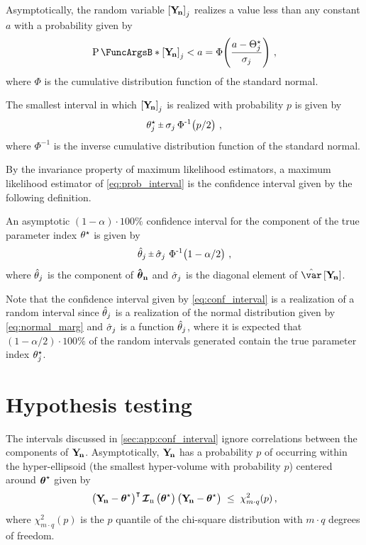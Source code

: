 \documentclass[
    11pt,
    extrafontsizes,
    article,
    oldfontcommands,
    final,
    oneside,
    openany,
    hidelinks]{memoir}
\begin{document}
Asymptotically, the random variable $\left[\mathrm{\boldsymbol{\mathbf{Y_{\!n}}}}\right]_j$ realizes a value less than any constant $a$ with a probability given by
\begin{equation}
    \Prob{\left[\sampdu\right]_j < a } = \operatorname{\Phi}\!\left(\frac{a - \tparam\param_j}{\sigma_j}\right)\,,
\end{equation}
where $\Phi$ is the cumulative distribution function of the standard normal.

The smallest interval in which $\left[\mathrm{\boldsymbol{\mathbf{Y_{\!n}}}}\right]_j$ is realized with probability $p$ is given by
\begin{equation}
\label{eq:prob_interval}
     \tparam\paramv_j \, \raisebox{.2ex}{$\scriptstyle\pm$} \, \sigma_j \operatorname{\Phi^{-1}}\!\left(p/2\right)\,,
\end{equation}
where $\Phi^{-1}$ is the inverse cumulative distribution function of the standard normal.

By the invariance property of maximum likelihood estimators, a maximum likelihood estimator of \cref{eq:prob_interval} is the confidence interval given by the following definition.
\begin{definition}
\label{def:conf_interval}
An asymptotic $(1 - \alpha) \cdot 100 \%$ confidence interval for the \jth component of the true parameter index ${\theta}^{\star}$ is given by
\begin{equation}
\label{eq:conf_interval}
    \estimator\paramv_j \, \raisebox{.2ex}{$\scriptstyle\pm$} \, \estimator{\sigma}_j \, \operatorname{\Phi^{-1}}\!\left(1-\alpha/2\right)\,,
\end{equation}
where $\hat{\theta}_j$ is the \jth component of $\boldsymbol{\mathbf{\hat{\boldsymbol{\mathbf{\theta}}}_{n}}}$ and $\hat{\sigma}_j$ is the \jth diagonal element of $\estimator{\var}\left[\sampdu\right]$.
\end{definition}
Note that the confidence interval given by \cref{eq:conf_interval} is a realization of a random interval since $\hat{\theta}_j$ is a realization of the normal distribution given by \cref{eq:normal_marg} and $\hat{\sigma}_j$ is a function $\hat{\theta}_j$, where it is expected that $(1-\alpha/2) \cdot 100 \%$ of the random intervals generated contain the true parameter index ${\theta}^{\star}_j$.

\section{Hypothesis testing}
\label{sec:app:conf_region}
The intervals discussed in \cref{sec:app:conf_interval} ignore correlations between the components of $\mathrm{\boldsymbol{\mathbf{Y_{\!n}}}}$. Asymptotically, $\mathrm{\boldsymbol{\mathbf{Y_{\!n}}}}$ has a probability $p$ of occurring within the hyper-ellipsoid (the smallest hyper-volume with probability $p$) centered around ${\boldsymbol{\mathbf{\theta}}}^{\star}$ given by
\begin{equation}
\label{eq:conf_region}
    \left(\mathrm{\boldsymbol{\mathbf{Y_{\!n}}}} - {\boldsymbol{\mathbf{\theta}}}^{\star}\right)^\intercal \operatorname{\boldsymbol{\mathcal{I}_n}}\left({\boldsymbol{\mathbf{\theta}}}^{\star}\right)\left(\mathrm{\boldsymbol{\mathbf{Y_{\!n}}}} - {\boldsymbol{\mathbf{\theta}}}^{\star}\right) \;\leq\; \chi_{m \cdot q}^{2}(p)\,,
\end{equation}
where $\chi_{m \cdot q}^2(p)$ is the $p$ quantile of the chi-square distribution with $m \cdot q$ degrees of freedom. 
\end{document}
